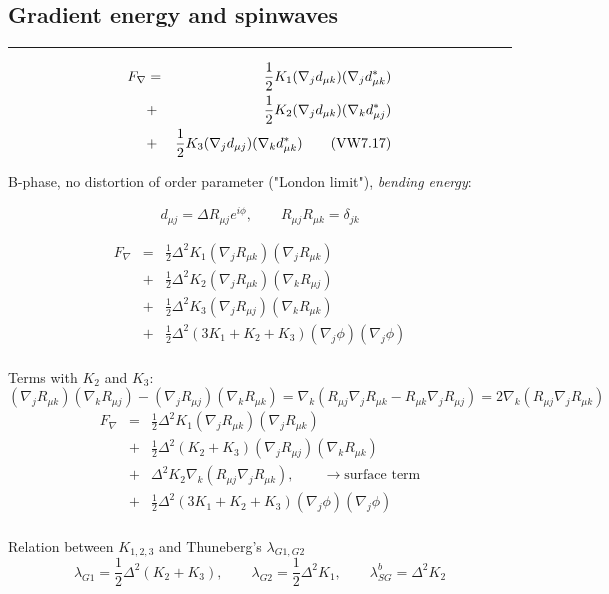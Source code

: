 \documentclass[a4paper]{article}
\begin{document}
\subsection*{Gradient energy and spinwaves}

\hrule

\begin{eqnarray*}
F_\nabla
&=& \frac12 K_1 (\nabla_j d_{\mu k})(\nabla_j d^*_{\mu k})\\
&+& \frac12 K_2 (\nabla_j d_{\mu k})(\nabla_k d^*_{\mu j})\\
&+& \frac12 K_3 (\nabla_j d_{\mu j})(\nabla_k d^*_{\mu k})
\qquad{\rm\small (VW 7.17)}\\
\end{eqnarray*}

B-phase, no distortion of order parameter ("London limit"),
{\it bending energy}:

$$
d_{\mu j}=\Delta R_{\mu j} e^{i\phi},\qquad
R_{\mu j} R_{\mu k} = \delta_{jk}
$$

\begin{eqnarray*}
F_\nabla
&=& \frac12 \Delta^2 K_1
 (\nabla_j R_{\mu k})(\nabla_j R_{\mu k})\\
&+& \frac12 \Delta^2 K_2
 (\nabla_j R_{\mu k})(\nabla_k R_{\mu j})\\
&+& \frac12 \Delta^2 K_3
 (\nabla_j R_{\mu j})(\nabla_k R_{\mu k})\\
&+& \frac12 \Delta^2 (3K_1+K_2+K_3)
 (\nabla_j \phi)(\nabla_j \phi)\\
\end{eqnarray*}

Terms with $K_2$ and $K_3$:
$$
(\nabla_j R_{\mu k})(\nabla_k R_{\mu j}) - (\nabla_j R_{\mu j})(\nabla_k R_{\mu k}) =
\nabla_k(R_{\mu j} \nabla_j R_{\mu k} - R_{\mu k} \nabla_j R_{\mu j}) =
2\nabla_k(R_{\mu j} \nabla_j R_{\mu k})
$$
\begin{eqnarray*}
F_\nabla
&=& \frac12\Delta^2 K_1 (\nabla_j R_{\mu k})(\nabla_j R_{\mu k})\\
&+& \frac12\Delta^2 (K_2+K_3) (\nabla_j R_{\mu j})(\nabla_k R_{\mu k})\\
&+& \Delta^2 K_2 \nabla_k(R_{\mu j} \nabla_j R_{\mu k}),\qquad
\rightarrow \mbox{surface term}\\
&+& \frac12 \Delta^2 (3K_1+K_2+K_3)
 (\nabla_j \phi)(\nabla_j \phi)\\
\end{eqnarray*}

Relation between $K_{1,2,3}$ and Thuneberg's $\lambda_{G1,G2}$
$$
\lambda_{G1} = \frac12\Delta^2 (K_2+K_3),\qquad
\lambda_{G2} = \frac12\Delta^2 K_1,\qquad
\lambda_{SG}^b = \Delta^2 K_2
$$
\end{document}
